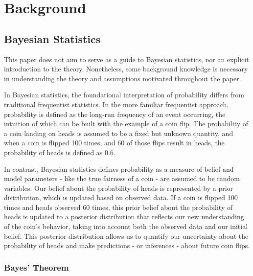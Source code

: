 \section{Background}


\subsection{Bayesian Statistics}

This paper does not aim to serve as a guide to Bayesian statistics, nor an
explicit introduction to the theory. Nonetheless, some background knowledge is
necessary in understanding the theory and assumptions motivated throughout the
paper.

In Bayesian statistics, the foundational interpretation of probability differs
from traditional frequentist statistics. In the more familiar frequentist approach,
probability is defined as the long-run frequency of an event occurring, the
intuition of which can be built with the example of a coin flip. The
probability of a coin landing on heads is assumed to be a fixed but unknown
quantity, and when a coin is flipped 100 times, and 60 of those flips result in
heads, the probability of heads is defined as 0.6. 

In contrast, Bayesian statistics defines probability as a measure of belief and
model parameters - like the true fairness of a coin - are assumed to be random
variables. Our belief about the probability of heads is represented by a prior
distribution, which is updated based on observed data. If a coin is flipped 100
times and heads observed 60 times, this prior belief about the probability of
heads is updated to a posterior distribution that reflects our new
understanding of the coin's behavior, taking into account both the observed
data and our initial belief. This posterior distribution allows us to quantify
our uncertainty about the probability of heads and make predictions - or
inferences - about future coin flips.

\subsubsection{Bayes' Theorem}

